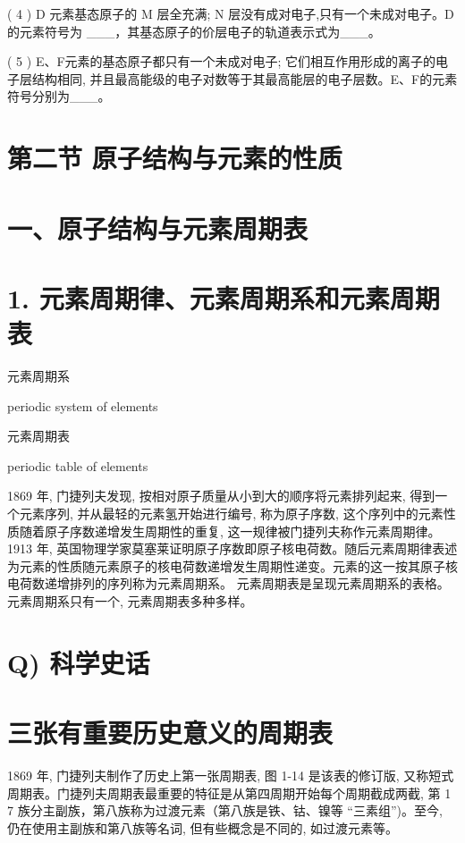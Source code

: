 \documentclass[10pt]{article}
\begin{document}
( 4 ) D 元素基态原子的 \(\mathrm{M}\) 层全充满; \(\mathrm{N}\) 层没有成对电子,只有一个未成对电子。D 的元素符号为 \_\_\_，其基态原子的价层电子的轨道表示式为\_\_\_。

( 5 ) E、F元素的基态原子都只有一个未成对电子; 它们相互作用形成的离子的电子层结构相同, 并且最高能级的电子对数等于其最高能层的电子层数。E、F的元素符号分别为\_\_\_。

\section*{第二节 原子结构与元素的性质}

\section*{一、原子结构与元素周期表}

\section*{1. 元素周期律、元素周期系和元素周期表}

\begin{mdframed}

元素周期系

periodic system of elements

元素周期表

periodic table of elements

\end{mdframed}

1869 年, 门捷列夫发现, 按相对原子质量从小到大的顺序将元素排列起来, 得到一个元素序列, 并从最轻的元素氢开始进行编号, 称为原子序数, 这个序列中的元素性质随着原子序数递增发生周期性的重复, 这一规律被门捷列夫称作元素周期律。1913 年, 英国物理学家莫塞莱证明原子序数即原子核电荷数。随后元素周期律表述为元素的性质随元素原子的核电荷数递增发生周期性递变。元素的这一按其原子核电荷数递增排列的序列称为元素周期系。 元素周期表是呈现元素周期系的表格。元素周期系只有一个, 元素周期表多种多样。

\section*{Q) 科学史话}

\section*{三张有重要历史意义的周期表}

1869 年, 门捷列夫制作了历史上第一张周期表, 图 1-14 是该表的修订版, 又称短式周期表。门捷列夫周期表最重要的特征是从第四周期开始每个周期截成两截, 第 1 7 族分主副族，第八族称为过渡元素（第八族是铁、钴、镍等 “三素组”)。至今, 仍在使用主副族和第八族等名词, 但有些概念是不同的, 如过渡元素等。
\end{document}
